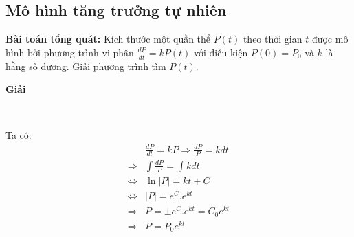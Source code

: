 \documentclass[13pt]{article}
\begin{document}
\subsection{Mô hình tăng trưởng tự nhiên}
\textbf{Bài toán tổng quát:} Kích thước một quần thể $P(t)$ theo thời gian $t$ được mô hình bởi phương trình vi phân $\frac{dP}{dt}=kP(t)$ với điều kiện $P(0)=P_0$ và $k$ là hằng số dương. Giải phương trình tìm $P(t)$.\\
\centerline{\textbf{Giải}}\\
\begin{minipage}{7cm}
Ta có:
\begin{align*}
    &\frac{dP}{dt}=kP\Rightarrow\frac{dP}{P}=kdt\\
    \Rightarrow &\int\frac{dP}{P}=\int kdt\\
    \Leftrightarrow &\ln|P|=kt+C\\
    \Leftrightarrow &|P|=e^C.e^{kt}\\
    \Rightarrow &P=\pm e^C.e^{kt}=C_0e^{kt}\\
    \Rightarrow &P=P_0e^{kt}
\end{align*}
\end{minipage}
\begin{minipage}{7cm}
    \begin{center}
    \end{center}
\end{minipage}
\end{document}
